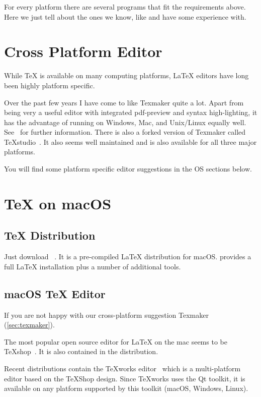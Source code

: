 For every platform there are several programs that fit the requirements above.
Here we just tell about the ones we know, like and have some experience
with.

\section{Cross Platform Editor}\label{sec:texmaker}

While \TeX{} is available on many computing platforms, \LaTeX{}
editors have long been highly platform specific.

Over the past few years I have come to like Texmaker quite a lot.
Apart from being very a useful editor with integrated pdf-preview and syntax
high-lighting, it has the advantage of running on Windows, Mac, and
Unix/Linux equally well.  See~\cite{texmaker} for
further information.  There is also a forked version of Texmaker called
TeXstudio~\cite{texstudio}.  It also seems well
maintained and is also available for all three major platforms.

You will find some platform specific editor suggestions in the OS sections
below.

\section{\TeX{} on macOS}

\subsection{\TeX{} Distribution}

Just download ~\cite{mactex}. It is a
pre-compiled \LaTeX{} distribution for macOS\@.  provides a full \LaTeX{}
installation plus a number of additional tools.

\subsection{macOS \TeX{} Editor}

If you are not happy with our cross-platform suggestion Texmaker (\autoref{sec:texmaker}).

The most popular open source editor for \LaTeX{} on the mac seems to be
\TeX{}shop~\cite{texshop}. It
is also contained in the  distribution.

Recent \TeXLive{} distributions contain the \TeX{}works editor~\cite{texworks}
which is a multi-platform editor based on the \TeX{}Shop
design. Since \TeX{}works uses the Qt toolkit, it is available on any platform
supported by this toolkit (macOS, Windows, Linux).

